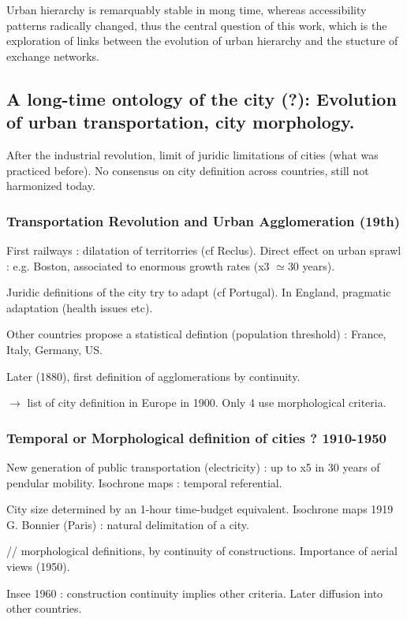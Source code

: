Urban hierarchy is remarquably stable in mong time, whereas accessibility patterns radically changed, thus the central question of this work, which is the exploration of links between the evolution of urban hierarchy and the stucture of exchange networks.


\subsection{A long-time ontology of the city (?): Evolution of urban transportation, city morphology.}

After the industrial revolution, limit of juridic limitations of cities (what was practiced before). No consensus on city definition across countries, still not harmonized today.

\subsubsection{Transportation Revolution and Urban Agglomeration (19th)}

First railways : dilatation of territorries (cf Reclus). Direct effect on urban sprawl : e.g. Boston, associated to enormous growth rates (x3 $\simeq 30$ years).

Juridic definitions of the city try to adapt (cf Portugal). In England, pragmatic adaptation (health issues etc).

Other countries propose a statistical defintion (population threshold) : France, Italy, Germany, US.

Later (1880), first definition of agglomerations by continuity.

$\rightarrow$ list of city definition in Europe in 1900. Only 4 use morphological criteria.

\subsubsection{Temporal or Morphological definition of cities ? 1910-1950}

New generation of public transportation (electricity) : up to x5 in 30 years of pendular mobility. Isochrone maps : temporal referential.

City size determined by an 1-hour time-budget equivalent. Isochrone maps 1919 G. Bonnier (Paris) : natural delimitation of a city.

// morphological definitions, by continuity of constructions. Importance of aerial views (1950).

Insee 1960 : construction continuity implies other criteria. Later diffusion into other countries.

